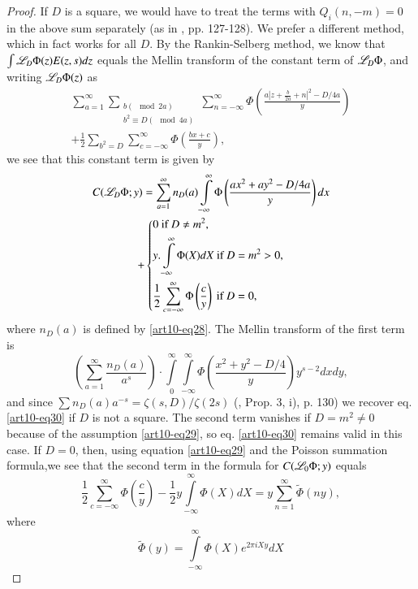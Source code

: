 \begin{proof}
If $D$ is a square, we would have to treat the terms with $Q_i (n,-m)=0$ in the above sum separately (as in \cite{art10-11}, pp. 127-128). We prefer a different method, which in fact works for all $D$. By the Rankin-Selberg method, we know that $\int \mathscr{L}_D \Phi (z) E (z,s)dz$ equals the Mellin transform of the constant term of $\mathscr{L}_D \Phi$, and writing $\mathscr{L}_D \Phi (z)$ as
\begin{multline*}
\sum\limits^\infty_{a=1} \sum\limits_{\substack{b(\mod 2 a)\\ b^2 \equiv D (\mod 4a)}} \sum\limits^\infty_{n = - \infty} \Phi \left(\frac{a\left|z  + \frac{b}{2a} + n\right|^2 - D / 4a}{y} \right)\\
+ \frac{1}{2} \sum\limits_{b^2 = D} \sum\limits^\infty_{c = - \infty} \Phi \left(\frac{bx+c}{y} \right), 
\end{multline*}
we see that this constant term is given by 
\begin{gather*}
C(\mathscr{L}_D \Phi; y) = \sum\limits^\infty_{a =1} n_D (a) \int\limits^\infty_{-\infty} \Phi \left(\frac{ax^2 + a y^2 - D / 4 a}{y} \right) d x\\
+\left\{
\begin{aligned}
& 0 \text{ if } D \neq m^2,\\
& y. \int\limits^\infty_{-\infty} \Phi (X) d X \text{ if } D = m^2 > 0,\\
& \frac{1}{2} \sum\limits^\infty_{c = - \infty} \Phi \left(\frac{c}{y} \right) \text{ if } D = 0,
\end{aligned}
\right.
\end{gather*} 
where $n_D (a)$ is defined by \eqref{art10-eq28}. The Mellin transform of the first term is 
$$
\left(\sum\limits^\infty_{a=1} \frac{n_D (a)}{a^s} \right) \cdot \int\limits^\infty_{0} \int\limits^\infty_{-\infty} \Phi \left(\frac{x^2 + y^2 - D/4}{y} \right) y^{s-2} d x dy,
$$
and since $\sum n_D (a) a^{-s} = \zeta(s, D)/ \zeta (2s)$ (\cite{art10-11}, Prop. 3, i), p. 130) we recover eq. \eqref{art10-eq30} if $D$ is not a square. The second term vanishes if $D = m^2 \neq 0$ because of the assumption \eqref{art10-eq29}, so eq. \eqref{art10-eq30} remains valid in this case. If $D =0$, then, using equation \eqref{art10-eq29} and the Poisson summation formula,\pageoriginale we see that the second term in the formula for $C (\mathscr{L}_0 \Phi; y)$ equals 
$$
\frac{1}{2} \sum\limits^\infty_{c = - \infty} \Phi (\frac{c}{y}) - \frac{1}{2} y \int\limits^\infty_{-\infty} \Phi (X) dX =  y \sum\limits^\infty_{n =1} \tilde{\Phi} (ny), 
$$
where 
$$
\tilde{\Phi} (y) = \int\limits^\infty_{-\infty} \Phi (X) e^{2 \pi i X y} d X
$$
\end{proof}
